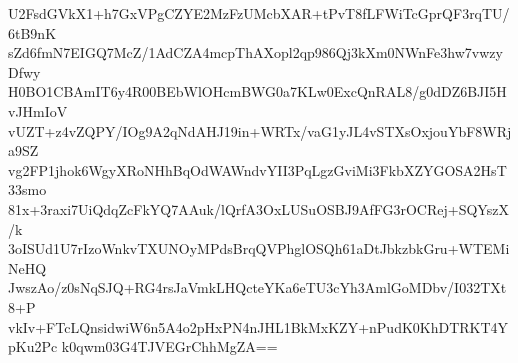 U2FsdGVkX1+h7GxVPgCZYE2MzFzUMcbXAR+tPvT8fLFWiTcGprQF3rqTU/6tB9nK
sZd6fmN7EIGQ7McZ/1AdCZA4mcpThAXopl2qp986Qj3kXm0NWnFe3hw7vwzyDfwy
H0BO1CBAmIT6y4R00BEbWlOHcmBWG0a7KLw0ExcQnRAL8/g0dDZ6BJI5HvJHmIoV
vUZT+z4vZQPY/IOg9A2qNdAHJ19in+WRTx/vaG1yJL4vSTXsOxjouYbF8WRja9SZ
vg2FP1jhok6WgyXRoNHhBqOdWAWndvYII3PqLgzGviMi3FkbXZYGOSA2HsT33smo
81x+3raxi7UiQdqZcFkYQ7AAuk/lQrfA3OxLUSuOSBJ9AfFG3rOCRej+SQYszX/k
3oISUd1U7rIzoWnkvTXUNOyMPdsBrqQVPhglOSQh61aDtJbkzbkGru+WTEMiNeHQ
JwszAo/z0sNqSJQ+RG4rsJaVmkLHQcteYKa6eTU3cYh3AmlGoMDbv/I032TXt8+P
vkIv+FTcLQnsidwiW6n5A4o2pHxPN4nJHL1BkMxKZY+nPudK0KhDTRKT4YpKu2Pc
k0qwm03G4TJVEGrChhMgZA==
